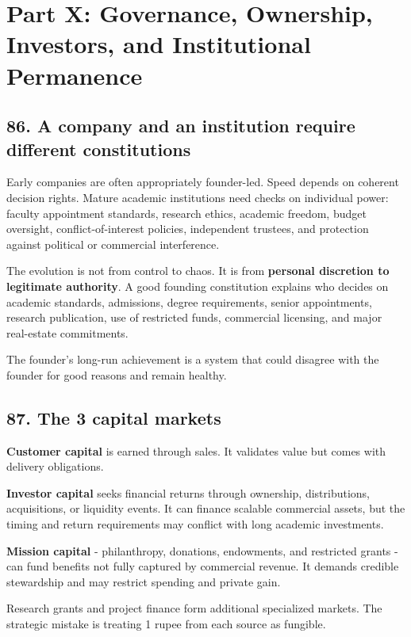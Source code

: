 
\section*{Part X: Governance, Ownership, Investors, and Institutional Permanence}

\subsection{86. A company and an institution require different constitutions}

Early companies are often appropriately founder-led. Speed depends on coherent decision rights. Mature academic institutions need checks on individual power: faculty appointment standards, research ethics, academic freedom, budget oversight, conflict-of-interest policies, independent trustees, and protection against political or commercial interference.

The evolution is not from control to chaos. It is from \textbf{personal discretion to legitimate authority}. A good founding constitution explains who decides on academic standards, admissions, degree requirements, senior appointments, research publication, use of restricted funds, commercial licensing, and major real-estate commitments.

The founder's long-run achievement is a system that could disagree with the founder for good reasons and remain healthy.

\subsection{87. The 3 capital markets}

\textbf{Customer capital} is earned through sales. It validates value but comes with delivery obligations.

\textbf{Investor capital} seeks financial returns through ownership, distributions, acquisitions, or liquidity events. It can finance scalable commercial assets, but the timing and return requirements may conflict with long academic investments.

\textbf{Mission capital} - philanthropy, donations, endowments, and restricted grants - can fund benefits not fully captured by commercial revenue. It demands credible stewardship and may restrict spending and private gain.

Research grants and project finance form additional specialized markets. The strategic mistake is treating 1 rupee from each source as fungible.

